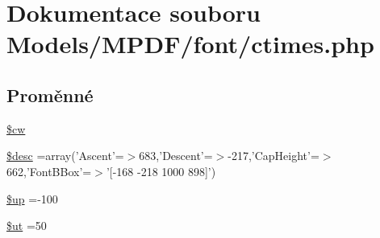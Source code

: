 \hypertarget{ctimes_8php}{\section{Dokumentace souboru Models/\-M\-P\-D\-F/font/ctimes.php}
\label{ctimes_8php}
}
\subsection*{Proměnné}
\begin{DoxyCompactItemize}
\item 
\hyperlink{ctimes_8php_ac2951b03dbb0317e6c61ec920b7479dc}{\$cw}
\item 
\hyperlink{ctimes_8php_a31059b9e4d0c5af34df20da32232ea9a}{\$desc} =array('Ascent'=$>$683,'Descent'=$>$-\/217,'Cap\-Height'=$>$662,'Font\-B\-Box'=$>$'\mbox{[}-\/168 -\/218 1000 898\mbox{]}')
\item 
\hyperlink{ctimes_8php_a6b5ad2ac55f9df46e8f34e78fbd6f176}{\$up} =-\/100
\item 
\hyperlink{ctimes_8php_aadd3f841051043ee58e587e840e8dd0b}{\$ut} =50
\item 

\end{DoxyCompactItemize}
